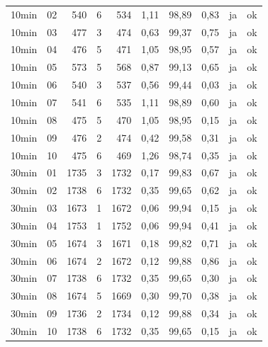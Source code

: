 \begin{longtable}{llrrrrrrrl}
10min & 02 & 540 & 6 & 534 & 1,11 & 98,89 & 0,83 & ja & ok \\
10min & 03 & 477 & 3 & 474 & 0,63 & 99,37 & 0,75 & ja & ok \\
10min & 04 & 476 & 5 & 471 & 1,05 & 98,95 & 0,57 & ja & ok \\
10min & 05 & 573 & 5 & 568 & 0,87 & 99,13 & 0,65 & ja & ok \\
10min & 06 & 540 & 3 & 537 & 0,56 & 99,44 & 0,03 & ja & ok \\
10min & 07 & 541 & 6 & 535 & 1,11 & 98,89 & 0,60 & ja & ok \\
10min & 08 & 475 & 5 & 470 & 1,05 & 98,95 & 0,15 & ja & ok \\
10min & 09 & 476 & 2 & 474 & 0,42 & 99,58 & 0,31 & ja & ok \\
10min & 10 & 475 & 6 & 469 & 1,26 & 98,74 & 0,35 & ja & ok \\
30min & 01 & 1735 & 3 & 1732 & 0,17 & 99,83 & 0,67 & ja & ok \\
30min & 02 & 1738 & 6 & 1732 & 0,35 & 99,65 & 0,62 & ja & ok \\
30min & 03 & 1673 & 1 & 1672 & 0,06 & 99,94 & 0,15 & ja & ok \\
30min & 04 & 1753 & 1 & 1752 & 0,06 & 99,94 & 0,41 & ja & ok \\
30min & 05 & 1674 & 3 & 1671 & 0,18 & 99,82 & 0,71 & ja & ok \\
30min & 06 & 1674 & 2 & 1672 & 0,12 & 99,88 & 0,86 & ja & ok \\
30min & 07 & 1738 & 6 & 1732 & 0,35 & 99,65 & 0,30 & ja & ok \\
30min & 08 & 1674 & 5 & 1669 & 0,30 & 99,70 & 0,38 & ja & ok \\
30min & 09 & 1736 & 2 & 1734 & 0,12 & 99,88 & 0,34 & ja & ok \\
30min & 10 & 1738 & 6 & 1732 & 0,35 & 99,65 & 0,15 & ja & ok \\
\bottomrule
\end{longtable}
